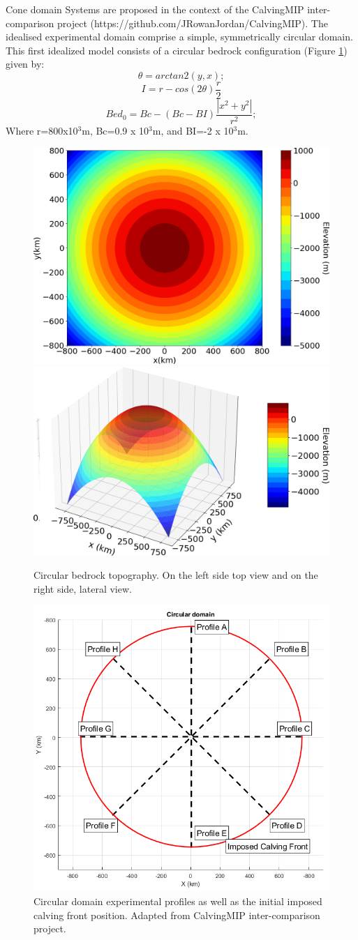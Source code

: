 \documentclass[11pt]{beamer}
\begin{document}
		\begin{frame}[allowframebreaks]{Cone domain}
		\justifying
		Systems are proposed in the context of the CalvingMIP inter-comparison project (https://github.com/JRowanJordan/CalvingMIP). The idealised experimental domain comprise a simple, symmetrically circular domain. This first idealized model consists of a circular bedrock configuration (Figure \ref{circular_topo_top}) given by:
		\begin{equation}
			\theta=arctan2(y,x);
		\end{equation}
		\begin{equation}
			I=r-cos(2\theta)\frac{r}{2}
		\end{equation}
		\begin{equation}
			Bed_0=Bc-(Bc-BI)\frac{|x^2+y^2|}{r^2};
		\end{equation}
		Where r=800x10$^3$m, Bc=0.9 x 10$^3$m, and BI=-2 x 10$^3$m. 
		\begin{figure}
			\centering
			\includegraphics[width=0.45\linewidth]{../fig/circular_topo_top.png}
			\includegraphics[width=0.45\linewidth]{../fig/circular_topo_jet}
			\caption{Circular bedrock topography. On the left side top view and on the right side, lateral view.}
			\label{circular_topo_top}
		\end{figure}
		\begin{figure}
			\centering
			\includegraphics[width=0.5\linewidth]{../fig/cone.png}
			\caption{Circular domain experimental profiles as well as the initial imposed calving front position. Adapted from CalvingMIP inter-comparison project.}
			\label{cone_profile}
		\end{figure}
		\end{frame}
\end{document}
